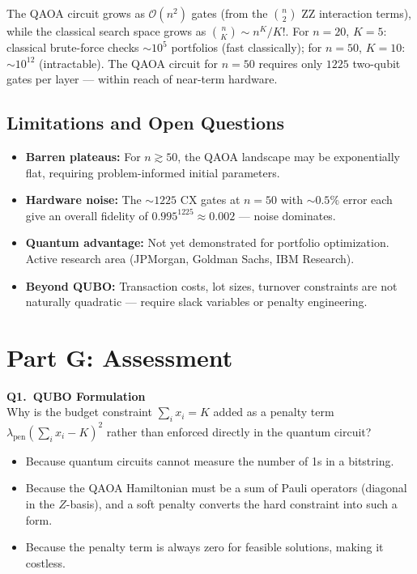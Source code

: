 \documentclass[a4paper,11pt]{article}
\begin{document}
The QAOA circuit grows as $\mathcal{O}(n^2)$ gates (from the $\binom{n}{2}$
ZZ interaction terms), while the classical search space grows as
$\binom{n}{K} \sim n^K / K!$. For $n=20$, $K=5$: classical brute-force
checks $\sim\!10^5$ portfolios (fast classically); for $n=50$, $K=10$:
$\sim\!10^{12}$ (intractable). The QAOA circuit for $n=50$ requires
only $1225$ two-qubit gates per layer — within reach of near-term hardware.

\subsection{Limitations and Open Questions}

\begin{itemize}
    \item \textbf{Barren plateaus:} For $n \gtrsim 50$, the QAOA landscape
          may be exponentially flat, requiring problem-informed initial
          parameters.
    \item \textbf{Hardware noise:} The $\sim\!1225$ CX gates at $n=50$
          with $\sim\!0.5\%$ error each give an overall fidelity of
          $0.995^{1225} \approx 0.002$ — noise dominates.
    \item \textbf{Quantum advantage:} Not yet demonstrated for portfolio
          optimization. Active research area (JPMorgan, Goldman Sachs,
          IBM Research).
    \item \textbf{Beyond QUBO:} Transaction costs, lot sizes, turnover
          constraints are not naturally quadratic — require slack variables
          or penalty engineering.
\end{itemize}

\section{Part G: Assessment}

\textbf{Q1.\ QUBO Formulation}\\
Why is the budget constraint $\sum_i x_i = K$ added as a penalty term
$\lambda_\text{pen}(\sum_i x_i - K)^2$ rather than enforced directly in
the quantum circuit?
\begin{itemize}
    \item[A)] Because quantum circuits cannot measure the number of 1s
              in a bitstring.
    \item[B)] Because the QAOA Hamiltonian must be a sum of Pauli operators
              (diagonal in the $Z$-basis), and a soft penalty converts the
              hard constraint into such a form.
    \item[C)] Because the penalty term is always zero for feasible solutions,
              making it costless.
\end{itemize}
\end{document}
